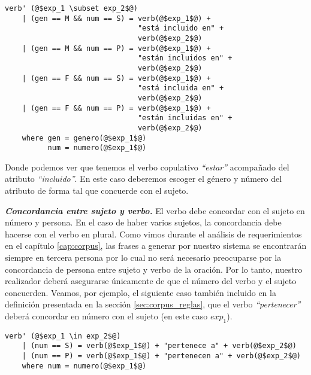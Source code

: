 \begin{mdframed}[style=codebox]
\begin{verbatim}
verb' (@$exp_1 \subset exp_2$@)
    | (gen == M && num == S) = verb(@$exp_1$@) + 
                               "está incluido en" + 
                               verb(@$exp_2$@) 
    | (gen == M && num == P) = verb(@$exp_1$@) + 
                               "están incluidos en" + 
                               verb(@$exp_2$@) 
    | (gen == F && num == S) = verb(@$exp_1$@) + 
                               "está incluida en" + 
                               verb(@$exp_2$@) 
    | (gen == F && num == P) = verb(@$exp_1$@) + 
                               "están incluidas en" + 
                               verb(@$exp_2$@) 
    where gen = genero(@$exp_1$@)
          num = numero(@$exp_1$@)
\end{verbatim}
\end{mdframed}

\noindent
Donde podemos ver que tenemos el verbo copulativo \emph{``estar''} acompañado del atributo \emph{``incluido''}. En este caso deberemos escoger el género y número del atributo de forma tal que concuerde con el sujeto.

\medskip
\noindent
\textbf{\emph{Concordancia entre sujeto y verbo.}} El verbo debe concordar con el sujeto en número y persona. En el caso de haber varios sujetos, la concordancia debe hacerse con el verbo en plural. Como vimos durante el análisis de requerimientos en el capítulo \ref{cap:corpus}, las frases a generar por nuestro sistema se encontrarán siempre en tercera persona por lo cual no será necesario preocuparse por la concordancia de persona entre sujeto y verbo de la oración. Por lo tanto, nuestro realizador deberá asegurarse únicamente de que el número del verbo y el sujeto concuerden.
\noindent
Veamos, por ejemplo, el siguiente caso también incluido en la definición presentada en la sección \ref{sec:corpus_reglas}, que el verbo \emph{``pertenecer''} deberá concordar en número con el sujeto (en este caso $exp_1$). 

\begin{mdframed}[style=codebox]
\begin{verbatim}
verb' (@$exp_1 \in exp_2$@)
    | (num == S) = verb(@$exp_1$@) + "pertenece a" + verb(@$exp_2$@) 
    | (num == P) = verb(@$exp_1$@) + "pertenecen a" + verb(@$exp_2$@) 
    where num = numero(@$exp_1$@)
\end{verbatim}
\end{mdframed}

